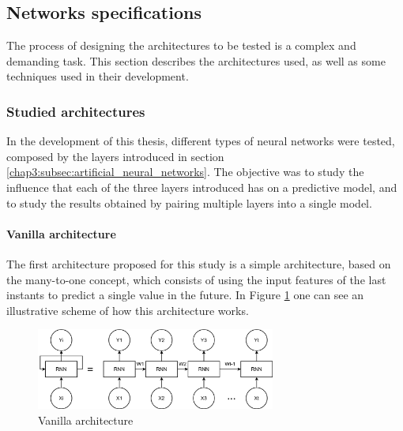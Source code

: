 \subsection{Networks specifications}\label{chap3:subsec:networks_specifications}

The process of designing the architectures to be tested is a complex and demanding task. This section describes the architectures used, as well as some techniques used in their development.

\subsubsection{Studied architectures}\label{chap3:subsubsec:studied_architectures}
In the development of this thesis, different types of neural networks were tested, composed by the layers introduced in section \ref{chap3:subsec:artificial_neural_networks}. The objective was to study the influence that each of the three layers introduced has on a predictive model, and to study the results obtained by pairing multiple layers into a single model. 

\paragraph{Vanilla architecture}

The first architecture proposed for this study is a simple architecture, based on the many-to-one concept, which consists of using the input features of the last instants to predict a single value in the future. 
In Figure \ref{arc1} one can see an illustrative scheme of how this architecture works.

\begin{figure}[h!]
    \centering
    \begin{center}
    \includegraphics[width=0.7\textwidth]{Images/arc1.png}
    \caption{Vanilla architecture}
    \label{arc1}
    \end{center}
\end{figure}

